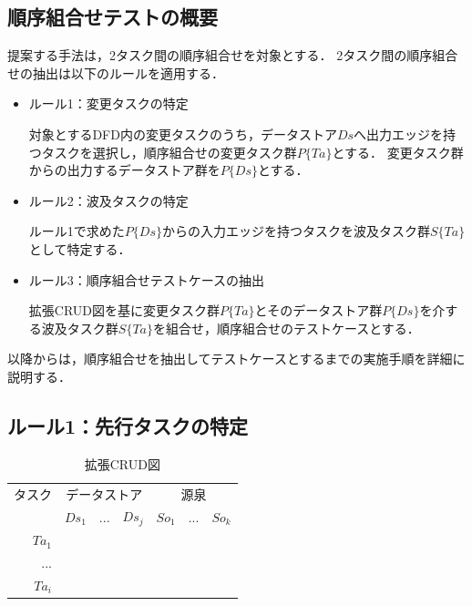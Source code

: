 \subsection{順序組合せテストの概要} \label{sec:5-2-1}
提案する手法は，2タスク間の順序組合せを対象とする．
2タスク間の順序組合せの抽出は以下のルールを適用する．
\begin{itemize}

\item ルール1：変更タスクの特定

対象とするDFD内の変更タスクのうち，データストア$Ds$へ出力エッジを持つタスクを選択し，順序組合せの変更タスク群$P\{Ta\}$とする．%
変更タスク群からの出力するデータストア群を$P\{Ds\}$とする．

\item ルール2：波及タスクの特定

ルール1で求めた$P\{Ds\}$からの入力エッジを持つタスクを波及タスク群$S\{Ta\}$として特定する．

\item ルール3：順序組合せテストケースの抽出

拡張CRUD図を基に変更タスク群$P\{Ta\}$とそのデータストア群$P\{Ds\}$を介する波及タスク群$S\{Ta\}$を組合せ，順序組合せのテストケースとする．
\end{itemize}

以降からは，順序組合せを抽出してテストケースとするまでの実施手順を詳細に説明する．

\subsection{ルール1：先行タスクの特定}
\begin{table}[t]
\caption{拡張CRUD図}
\label{CRUDIO}
\begin{center}
\begin{tabular}{r|r|r|r|r|r|r}
\multicolumn{1}{c|}{タスク} & \multicolumn{3}{c|}{データストア} & \multicolumn{3}{c}{源泉} \\
\cline{2-7}\multicolumn{1}{c|}{} & $Ds_1$ & $...$ & $Ds_j$ & $So_1$ & $...$ & $So_k$ \\
\hline
\hline
$Ta_1$ &   &   &   &   &   &  \\
\hline
$...$ &   &   &   &   &   &  \\
\hline
$Ta_i$ &   &   &   &   &   &  \\
    \hline
\end{tabular}%
\end{center}
\end{table}

